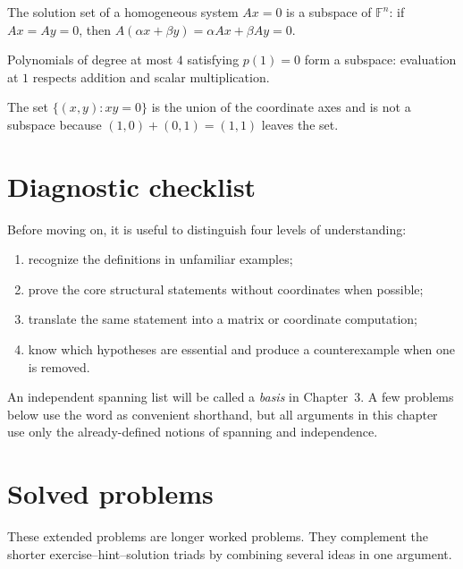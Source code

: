 \begin{example}\label{ex:i02-worked-01}
The solution set of a homogeneous system $Ax=0$ is a subspace of $\mathbb F^n$: if $Ax=Ay=0$, then $A(\alpha x+\beta y)=\alpha Ax+\beta Ay=0$.
\end{example}

\begin{example}\label{ex:i02-worked-02}
Polynomials of degree at most $4$ satisfying $p(1)=0$ form a subspace: evaluation at $1$ respects addition and scalar multiplication.
\end{example}

\begin{example}[A nonexample]\label{ex:i02-worked-03}
The set $\{(x,y):xy=0\}$ is the union of the coordinate axes and is not a subspace because $(1,0)+(0,1)=(1,1)$ leaves the set.
\end{example}

\section{Diagnostic checklist}
Before moving on, it is useful to distinguish four levels of understanding:
\begin{enumerate}
\item recognize the definitions in unfamiliar examples;
\item prove the core structural statements without coordinates when possible;
\item translate the same statement into a matrix or coordinate computation;
\item know which hypotheses are essential and produce a counterexample when one is removed.
\end{enumerate}

\begin{remark}
An independent spanning list will be called a \emph{basis} in Chapter~3. A few
problems below use the word as convenient shorthand, but all arguments in this
chapter use only the already-defined notions of spanning and independence.
\end{remark}

\section{Solved problems}
These extended problems are longer worked problems. They complement the shorter exercise--hint--solution triads by combining several ideas in one argument.

